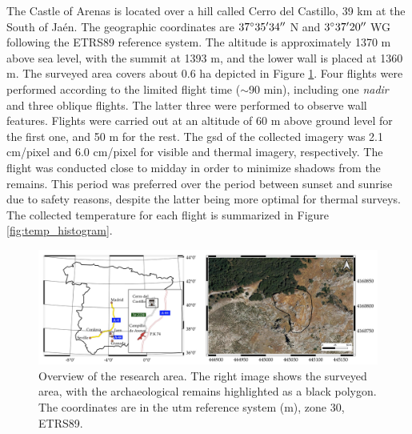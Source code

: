 The Castle of Arenas is located over a hill called Cerro del Castillo, 39 \si{\kilo\meter} at the South of Jaén. The geographic coordinates are $37^{\circ}35'34'' \hspace{1mm}$N and $3^{\circ}37'20'' \hspace{1mm}$WG following the ETRS89 reference system. The altitude is approximately 1370 \si{\meter} above sea level, with the summit at 1393 \si{\meter}, and the lower wall is placed at 1360 \si{\meter}. The surveyed area covers about 0.6 \si{\hectare} depicted in Figure \ref{fig:study_site}. Four flights were performed according to the limited flight time ($\sim$90 \si{\minute}), including one \textit{nadir} and three oblique flights. The latter three were performed to observe wall features. Flights were carried out at an altitude of 60 \si{\meter} above ground level for the first one, and 50 \si{\meter} for the rest. The \acrshort{gsd} of the collected imagery was 2.1 \si{\centi\meter}/pixel and 6.0 \si{\centi\meter}/pixel for visible and thermal imagery, respectively. The flight was conducted close to midday in order to minimize shadows from the remains. This period was preferred over the period between sunset and sunrise due to safety reasons, despite the latter being more optimal for thermal surveys. The collected temperature for each flight is summarized in Figure \ref{fig:temp_histogram}. 

\begin{figure}[htbp]
  \centering
  \includegraphics[width=.92\linewidth]{figs/castle_puerta_arenas/study_area.png}
  \caption{Overview of the research area. The right image shows the surveyed area, with the archaeological remains highlighted as a black polygon. The coordinates are in the \acrshort{utm} reference system (\si{\meter}), zone 30, ETRS89.}
  \label{fig:study_site}
\end{figure}

